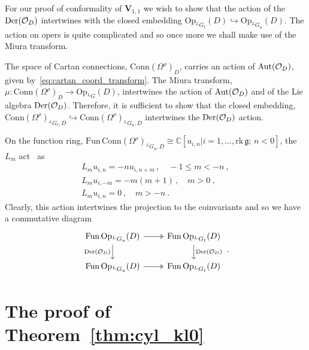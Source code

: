 \documentclass[a4paper]{article}
\def\IC{\mathbb{C}}
\def\OO{{\cal O}}
\def\gf{\mathfrak{g}}
\def\V{\mathbf{V}}
\def \Op{\mathrm{Op}}
\begin{document}
For our proof of conformality of $\V_{1,1}$ we wish to show that the action of the $\mathrm{Der}(\OO_D)$ intertwines with the closed embedding $\mathrm{Op}_{^LG_t}(D)\hookrightarrow\mathrm{Op}_{^L G_u}(D)$. The action on opers is quite complicated and so once more we shall make use of the Miura transform.

The space of Cartan connections, $\mathrm{Conn}(\Omega^\rho)_D$, carries an action of $\mathrm{Aut}(\OO_D)$, given by~\eqref{eq:cartan_coord_transform}. The Miura transform, $\mu:\mathrm{Conn}(\Omega^\rho)_D\rightarrow \mathrm{Op}_{^L G}(D)$, intertwines the action of $\mathrm{Aut}(\OO_D)$ and of the Lie algebra $\mathrm{Der}(\OO_D)$. Therefore, it is sufficient to show that the closed embedding, $\mathrm{Conn}(\Omega^\rho)_{^LG_t,D}\hookrightarrow \mathrm{Conn}(\Omega^\rho)_{^LG_u,D}$ intertwines the $\mathrm{Der}(\OO_D)$ action.

On the function ring, $\mathrm{Fun}\,\mathrm{Conn}(\Omega^\rho)_{^LG_u,D}\cong \IC[u_{i,n}|i=1,\dots,\mathrm{rk}\, \gf;\,n<0]$, the $L_m$ act~\cite{Frenkel:2007} as
\begin{equation}
	\begin{split}
	L_m u_{i,n} = - n u_{i,n+m}\,, \quad -1\le m< -n ~,\\
	L_m u_{i,-m} = -m(m+1)\,, \quad m>0~,\\
	L_m u_{i,n} =0\,, \quad m>-n~.
	\end{split}
\end{equation}
Clearly, this action intertwines the projection to the coinvariants and so we have a commutative diagram
\begin{equation}\label{eq:der_od_comm}
	\begin{tikzcd}
	\mathrm{Fun}\,\mathrm{Op}_{^LG_u}(D) \arrow[r,twoheadrightarrow] \arrow[d, "\mathrm{Der}(\OO_D)",swap] & \mathrm{Fun}\, \mathrm{\Op}_{^LG_t}(D)\arrow[d, "\mathrm{Der}(\OO_D)"]\\
	\mathrm{Fun}\,\mathrm{Op}_{^LG_u}(D)\arrow[r,twoheadrightarrow] & \mathrm{Fun}\, \mathrm{\Op}_{^LG_t}(D)
	\end{tikzcd}
	~.
\end{equation}


\section{\label{app:proof_cyl}The proof of Theorem~\ref{thm:cyl_kl0}}
\end{document}

